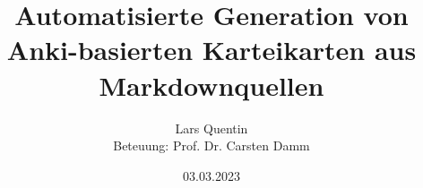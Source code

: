 \title{Automatisierte Generation von Anki-basierten Karteikarten aus Markdownquellen}
\author{Lars Quentin\\Beteuung: Prof. Dr. Carsten Damm}
\date{03.03.2023}
